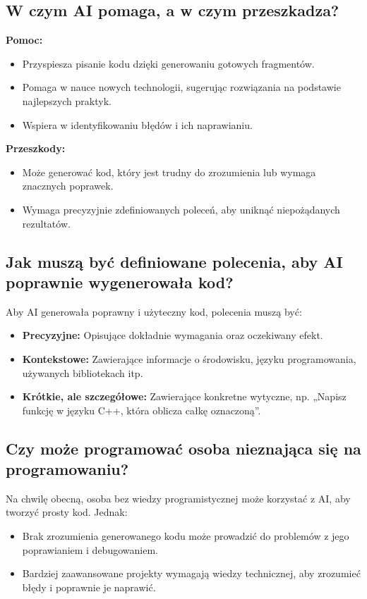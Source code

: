 \subsection{W czym AI pomaga, a w czym przeszkadza?}

\textbf{Pomoc:}
\begin{itemize}
  \item Przyspiesza pisanie kodu dzięki generowaniu gotowych fragmentów.
  \item Pomaga w nauce nowych technologii, sugerując rozwiązania na podstawie najlepszych praktyk.
  \item Wspiera w identyfikowaniu błędów i ich naprawianiu.
\end{itemize}

\textbf{Przeszkody:}
\begin{itemize}
  \item Może generować kod, który jest trudny do zrozumienia lub wymaga znacznych poprawek.
  \item Wymaga precyzyjnie zdefiniowanych poleceń, aby uniknąć niepożądanych rezultatów.
\end{itemize}

\subsection{Jak muszą być definiowane polecenia, aby AI poprawnie wygenerowała kod?}

Aby AI generowała poprawny i użyteczny kod, polecenia muszą być:
\begin{itemize}
  \item \textbf{Precyzyjne:} Opisujące dokładnie wymagania oraz oczekiwany efekt.
  \item \textbf{Kontekstowe:} Zawierające informacje o środowisku, języku programowania, używanych bibliotekach itp.
  \item \textbf{Krótkie, ale szczegółowe:} Zawierające konkretne wytyczne, np. „Napisz funkcję w języku C++, która oblicza całkę oznaczoną”.
\end{itemize}

\subsection{Czy może programować osoba nieznająca się na programowaniu?}

Na chwilę obecną, osoba bez wiedzy programistycznej może korzystać z AI, aby tworzyć prosty kod. Jednak:
\begin{itemize}
  \item Brak zrozumienia generowanego kodu może prowadzić do problemów z jego poprawianiem i debugowaniem.
  \item Bardziej zaawansowane projekty wymagają wiedzy technicznej, aby zrozumieć błędy i poprawnie je naprawić.
\end{itemize}

